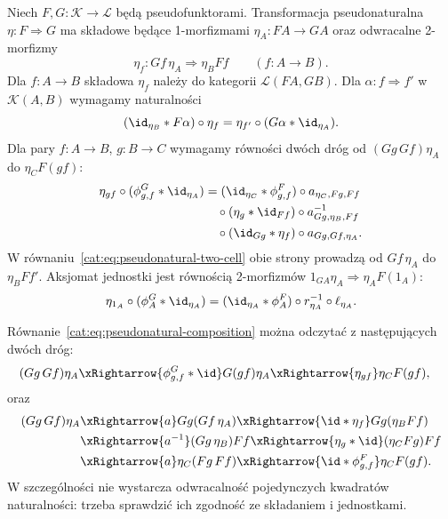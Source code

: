 \begin{definicja}\label{cat:def:pseudonatural}
Niech $F,G:\mathcal K\to\mathcal L$ będą pseudofunktorami. Transformacja pseudonaturalna $\eta:F\Rightarrow G$ ma składowe będące 1-morfizmami $\eta_A:FA\to GA$ oraz odwracalne 2-morfizmy
\[
 \eta_f:Gf\,\eta_A\Rightarrow\eta_B Ff
 \qquad(f:A\to B).
\]
Dla $f:A\to B$ składowa $\eta_f$ należy do kategorii $\mathcal L(FA,GB)$. Dla $\alpha:f\Rightarrow f'$ w $\mathcal K(A,B)$ wymagamy naturalności
\begin{equation}\label{cat:eq:pseudonatural-two-cell}
 (\id_{\eta_B}\ast F\alpha)\circ\eta_f
 =\eta_{f'}\circ(G\alpha\ast\id_{\eta_A}).
\end{equation}
Dla pary $f:A\to B$, $g:B\to C$ wymagamy równości dwóch dróg od $(Gg\,Gf)\eta_A$ do $\eta_C F(gf)$:
\begin{equation}\label{cat:eq:pseudonatural-composition}
\begin{aligned}
 \eta_{gf}\circ(\phi^G_{g,f}\ast\id_{\eta_A})
 &= (\id_{\eta_C}\ast\phi^F_{g,f})
    \circ a_{\eta_C,Fg,Ff}\\
 &\quad\circ(\eta_g\ast\id_{Ff})
    \circ a_{Gg,\eta_B,Ff}^{-1}\\
 &\quad\circ(\id_{Gg}\ast\eta_f)
    \circ a_{Gg,Gf,\eta_A}.
\end{aligned}
\end{equation}
W równaniu~\eqref{cat:eq:pseudonatural-two-cell} obie strony prowadzą od $Gf\,\eta_A$ do $\eta_B Ff'$. Aksjomat jednostki jest równością 2-morfizmów
$1_{GA}\eta_A\Rightarrow\eta_A F(1_A)$:
\begin{equation}\label{cat:eq:pseudonatural-unit}
 \eta_{1_A}\circ(\phi^G_A\ast\id_{\eta_A})
 =(\id_{\eta_A}\ast\phi^F_A)\circ r_{\eta_A}^{-1}
       \circ\ell_{\eta_A}.
\end{equation}
\end{definicja}

Równanie~\eqref{cat:eq:pseudonatural-composition} można odczytać z następujących dwóch dróg:
\[
\begin{aligned}
 (Gg\,Gf)\eta_A
 &\xRightarrow{\phi^G_{g,f}\ast\id}G(gf)\eta_A
 \xRightarrow{\eta_{gf}}\eta_C F(gf),
\end{aligned}
\]
oraz
\[
\begin{aligned}
 (Gg\,Gf)\eta_A
 &\xRightarrow{a}Gg(Gf\,\eta_A)
 \xRightarrow{\id\ast\eta_f}Gg(\eta_B Ff)\\
 &\xRightarrow{a^{-1}}(Gg\,\eta_B)Ff
 \xRightarrow{\eta_g\ast\id}(\eta_C Fg)Ff\\
 &\xRightarrow{a}\eta_C(Fg\,Ff)
 \xRightarrow{\id\ast\phi^F_{g,f}}\eta_C F(gf).
\end{aligned}
\]
W szczególności nie wystarcza odwracalność pojedynczych kwadratów naturalności: trzeba sprawdzić ich zgodność ze składaniem i jednostkami.

